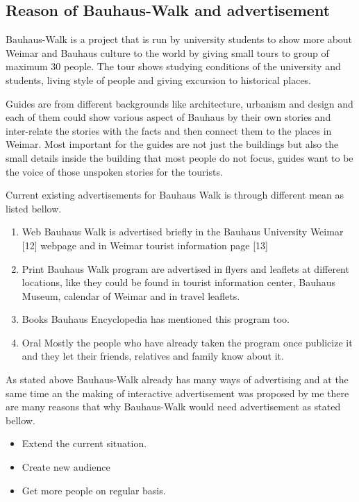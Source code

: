 \subsection{Reason of Bauhaus-Walk and advertisement}

Bauhaus-Walk is a project that is run by university students to show more about Weimar and Bauhaus culture to the world by giving small tours to group of maximum 30 people. The tour shows studying conditions of the university and students, living style of people and giving excursion to historical places.

Guides are from different backgrounds like architecture, urbanism and design and each of them could show various aspect of Bauhaus by their own stories and inter-relate the stories with the facts and then connect them to the places in Weimar. Most important for the guides are not just the buildings but also the small details inside the building that most people do not focus, guides want to be the voice of those unspoken stories for the tourists.

Current existing advertisements for Bauhaus Walk is through different mean as listed bellow.

\begin {enumerate}

\item	Web
Bauhaus Walk is advertised briefly in the Bauhaus University Weimar [12] webpage and in Weimar tourist information page [13]

\item	Print
Bauhaus Walk program are advertised in flyers and leaflets at different locations, like they could be found in tourist information center, Bauhaus Museum, calendar of Weimar and in travel leaflets. 

\item	Books
Bauhaus Encyclopedia has mentioned this program too. 

\item	Oral
Mostly the people who have already taken the program once publicize it and they let their friends, relatives and family know about it.


\end{enumerate}

As stated above Bauhaus-Walk already has many ways of advertising and at the same time an the making of interactive advertisement was proposed by me there are many reasons that why Bauhaus-Walk would need advertisement as stated bellow.


\begin {itemize}
\item Extend the current situation.
\item	Create new audience
\item	Get more people on regular basis.
\end{itemize}


